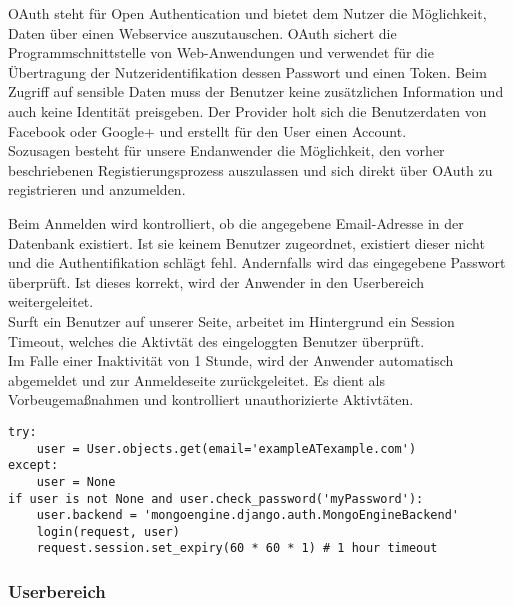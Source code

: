 OAuth steht für Open Authentication und bietet dem Nutzer die Möglichkeit, Daten über einen Webservice auszutauschen. \grqq{}OAuth sichert die Programmschnittstelle von Web-Anwendungen und verwendet für die Übertragung der Nutzeridentifikation dessen Passwort und einen Token\grqq{}\cite{OAUTH}. Beim Zugriff auf sensible Daten muss der Benutzer keine zusätzlichen Information und auch keine Identität preisgeben. Der Provider holt sich die Benutzerdaten von Facebook oder Google+ und erstellt für den User einen Account.\\
Sozusagen besteht für unsere Endanwender die Möglichkeit, den vorher beschriebenen Registierungsprozess auszulassen und sich direkt über OAuth zu registrieren und anzumelden.


Beim Anmelden wird kontrolliert, ob die angegebene Email-Adresse in der Datenbank existiert. Ist sie keinem Benutzer zugeordnet, existiert dieser nicht und die Authentifikation schlägt fehl. Andernfalls wird das eingegebene Passwort überprüft. Ist dieses korrekt, wird der Anwender in den Userbereich weitergeleitet.\\

Surft ein Benutzer auf unserer Seite, arbeitet im Hintergrund ein Session Timeout, welches die Aktivtät des eingeloggten Benutzer überprüft.\\
Im Falle einer Inaktivität von 1 Stunde, wird der Anwender automatisch abgemeldet und zur Anmeldeseite zurückgeleitet. Es dient als Vorbeugemaßnahmen und kontrolliert unauthorizierte Aktivtäten.

\begin{lstlisting}[caption={Session Timeout}]
try:
    user = User.objects.get(email='exampleATexample.com')
except:
    user = None
if user is not None and user.check_password('myPassword'):
    user.backend = 'mongoengine.django.auth.MongoEngineBackend'
    login(request, user)
    request.session.set_expiry(60 * 60 * 1) # 1 hour timeout
\end{lstlisting}
\newpage 

\subsubsection{Userbereich}


